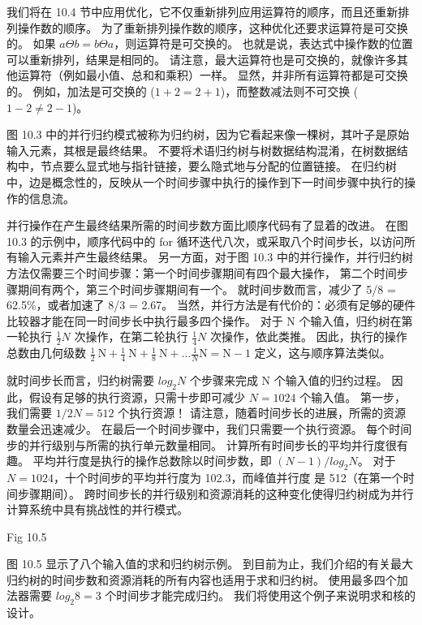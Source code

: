 我们将在 10.4 节中应用优化，它不仅重新排列应用运算符的顺序，而且还重新排列操作数的顺序。 
为了重新排列操作数的顺序，这种优化还要求运算符是可交换的。 如果 $a \Theta b=b \Theta a$，则运算符是可交换的。 
也就是说，表达式中操作数的位置可以重新排列，结果是相同的。 
请注意，最大运算符也是可交换的，就像许多其他运算符（例如最小值、总和和乘积）一样。 
显然，并非所有运算符都是可交换的。 例如，加法是可交换的 ($1+2 = 2+1$)，而整数减法则不可交换 ($1 - 2 \neq 2 - 1$)。

图 10.3 中的并行归约模式被称为归约树，因为它看起来像一棵树，其叶子是原始输入元素，其根是最终结果。 
不要将术语归约树与树数据结构混淆，在树数据结构中，节点要么显式地与指针链接，要么隐式地与分配的位置链接。 
在归约树中，边是概念性的，反映从一个时间步骤中执行的操作到下一时间步骤中执行的操作的信息流。

并行操作在产生最终结果所需的时间步数方面比顺序代码有了显着的改进。 
在图 10.3 的示例中，顺序代码中的 for 循环迭代八次，或采取八个时间步长，以访问所有输入元素并产生最终结果。 
另一方面，对于图 10.3 中的并行操作，并行归约树方法仅需要三个时间步骤：第一个时间步骤期间有四个最大操作，
第二个时间步骤期间有两个，第三个时间步骤期间有一个。 就时间步数而言，减少了 5/8 = 62.5\%，或者加速了 8/3 = 2.67。 
当然，并行方法是有代价的：必须有足够的硬件比较器才能在同一时间步长中执行最多四个操作。 
对于 N 个输入值，归约树在第一轮执行 $\frac{1}{2}N$ 次操作，在第二轮执行 $\frac{1}{4}N$ 次操作，依此类推。 
因此，执行的操作总数由几何级数 $\frac{1}{2} \mathrm{~N}+ \frac{1}{4} \mathrm{~N}+ \frac{1}{8} \mathrm{~N}+\ldots \frac{1}{N} \mathrm{N}=\mathrm{N}-1$ 定义，这与顺序算法类似。

就时间步长而言，归约树需要 $log_2 N$ 个步骤来完成 N 个输入值的归约过程。 
因此，假设有足够的执行资源，只需十步即可减少 $N = 1024$ 个输入值。 
第一步，我们需要 $1/2 N = 512$ 个执行资源！ 请注意，随着时间步长的进展，所需的资源数量会迅速减少。 
在最后一个时间步骤中，我们只需要一个执行资源。 每个时间步的并行级别与所需的执行单元数量相同。 
计算所有时间步长的平均并行度很有趣。 平均并行度是执行的操作总数除以时间步数，即 $(N - 1)/log_2 N$。
对于 $N = 1024$，十个时间步的平均并行度为 102.3，而峰值并行度 是 512（在第一个时间步骤期间）。 
跨时间步长的并行级别和资源消耗的这种变化使得归约树成为并行计算系统中具有挑战性的并行模式。

{\color{red} Fig 10.5}

图 10.5 显示了八个输入值的求和归约树示例。 
到目前为止，我们介绍的有关最大归约树的时间步数和资源消耗的所有内容也适用于求和归约树。 
使用最多四个加法器需要 $log_2 8 = 3$ 个时间步才能完成归约。 我们将使用这个例子来说明求和核的设计。

